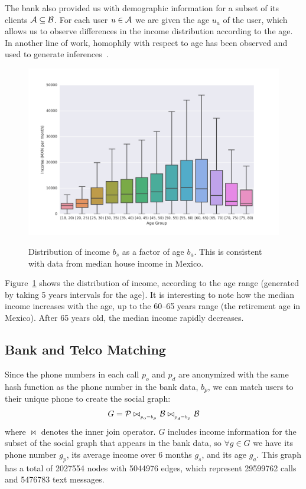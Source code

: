 The bank also provided us with demographic information for a subset of its clients \( \mathcal{A} \subseteq \mathcal{B} \). For each user \( u \in \mathcal{A} \) we are given the age \( u_a \) of the user, which allows us to observe differences in the income distribution according to the age. In another line of work, homophily with respect to age has been observed and used to generate inferences~\cite{brea2014}.

\begin{figure}[h]
\begin{center}
{\includegraphics[width=0.95\columnwidth,trim={1.0cm 0.8cm 2.5cm 1.2cm},clip=true]
{figures/income_age_boxplot4/income_age_boxplot4.png}
}
\caption{Distribution of income $b_s$ as a factor of age $b_a$. This is consistent with data from median house income in Mexico\cite{gallup2013}.}
\label{income_age_boxplot}
\end{center}
\end{figure}

Figure~\ref{income_age_boxplot} shows the distribution of income, according to the age range (generated by taking 5 years intervals for the age).
It is interesting to note how the median income increases with the age, up to
the 60--65 years range (the retirement age in Mexico). After 65 years old, the median income rapidly decreases.


\subsection{Bank and Telco Matching}

Since the phone numbers in each call $ p_o $ and $ p_d $ are anonymized with the same hash function as the phone number in the bank data, $ b_p $, we can match users to their unique phone to create the social graph:
$$ G = \mathcal{P} \bowtie_{_{p_o = b_p}} \mathcal{B} \bowtie_{_{p_d = b_p}} \mathcal{B} $$
where $\bowtie$ denotes the inner join operator.
$G$ includes income information for the subset of the social graph that appears in the bank data, so \( \forall g \in G \) we have its phone number \( g_p \),  its average income over 6 months \( g_s \), and its age \( g_a \).
This graph has a total of \num{2027554} nodes with \num{5044976} edges, which represent \num{29599762} calls and \num{5476783} text messages.

